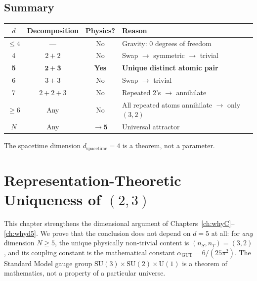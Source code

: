 \documentclass[12pt]{article}
\theoremstyle{remark}
\theoremstyle{definition}
\newcommand{\agut}{\alpha_{\mathrm{GUT}}}
\begin{document}
\subsection{Summary}

\begin{center}
\begin{tabular}{cccl}
\hline
$d$ & Decomposition & Physics? & Reason \\
\hline
$\leq 4$ & --- & No & Gravity: 0 degrees of freedom \\
4 & $2+2$ & No & Swap $\to$ symmetric $\to$ trivial \\
\textbf{5} & $\mathbf{2+3}$ & \textbf{Yes} & \textbf{Unique distinct atomic pair} \\
6 & $3+3$ & No & Swap $\to$ trivial \\
7 & $2+2+3$ & No & Repeated 2's $\to$ annihilate \\
$\geq 6$ & Any & No & All repeated atoms annihilate $\to$ only $(3,2)$ \\
$N$ & Any & $\to \mathbf{5}$ & Universal attractor \\
\hline
\end{tabular}
\end{center}

\noindent The spacetime dimension $d_\text{spacetime} = 4$ is a theorem, not a parameter.



\section{Representation-Theoretic Uniqueness of $(2,3)$}
\label{ch:rep_uniqueness}

This chapter strengthens the dimensional argument of Chapters~\ref{ch:whyC}--\ref{ch:whyd5}. We prove that the conclusion does not depend on $d = 5$ at all: for \emph{any} dimension $N \geq 5$, the unique physically non-trivial content is $(n_S, n_T) = (3, 2)$, and its coupling constant is the mathematical constant $\agut = 6/(25\pi^2)$. The Standard Model gauge group $\mathrm{SU}(3)\times\mathrm{SU}(2)\times\mathrm{U}(1)$ is a theorem of mathematics, not a property of a particular universe.
\end{document}
